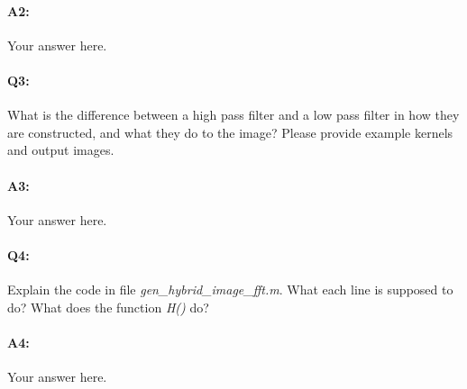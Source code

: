 \paragraph{A2:} Your answer here.




\pagebreak
\paragraph{Q3:} What is the difference between a high pass filter and a low pass filter in how they are constructed, and what they do to the image? Please provide example kernels and output images.

\paragraph{A3:} Your answer here.




\pagebreak
\paragraph{Q4:} Explain the code in file \emph{gen_hybrid_image_fft.m}. What each line is supposed to do? What does the function \emph{H()} do?


\paragraph{A4:} Your answer here.








